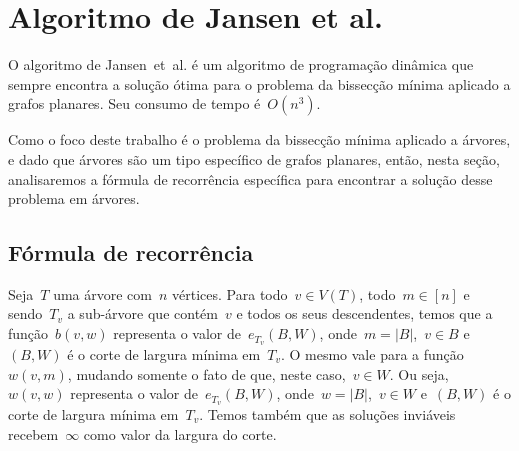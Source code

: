 \section {Algoritmo de Jansen et al.}

O algoritmo de Jansen~et~al. é um algoritmo de 
programação dinâmica que sempre encontra
a solução ótima para o problema da bissecção
mínima aplicado a grafos planares.
Seu consumo de tempo é~$O(n^3)$.

Como o foco deste trabalho é o problema da 
bissecção mínima aplicado a árvores, e dado
que árvores são um tipo específico de grafos
planares, então, nesta seção, analisaremos a 
fórmula de recorrência específica para encontrar
a solução desse problema em árvores. 

\bigskip
\bigskip

\subsection*{Fórmula de recorrência}

Seja~$T$ uma árvore com~$n$ vértices. 
Para todo~${v\in V(T)}$, todo~${m\in[n]}$
e sendo~$T_v$ a sub-árvore que contém~$v$
e todos os seus descendentes,
temos que a função~$b(v,w)$ representa o valor
de~$e_{T_v}(B,W)$, onde~${m=|B|}$,~${v\in B}$
e~$(B,W)$ é o corte de largura mínima em~$T_v$.
O mesmo vale para a função~$w(v,m)$, mudando somente
o fato de que, neste caso,~${v\in W}$.
Ou seja,~$w(v,w)$ representa o valor
de~$e_{T_v}(B,W)$, onde~${w=|B|}$,~${v\in W}$
e~$(B,W)$ é o corte de largura mínima em~$T_v$.
Temos também que as soluções inviáveis recebem~$\infty$
como valor da largura do corte.

